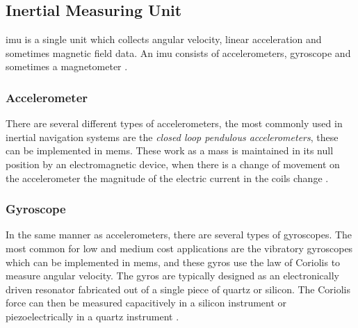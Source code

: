 \subsection{Inertial Measuring Unit}
\acrfull{imu} is a single unit which collects angular velocity, linear acceleration and sometimes magnetic field data. An \acrshort{imu} consists of accelerometers, gyroscope and sometimes a magnetometer \cite{vik}. 

\subsubsection{Accelerometer}
There are several different types of accelerometers, the most commonly used in inertial navigation systems are the \textit{closed loop pendulous accelerometers}, these can be implemented in \acrfull{mems}. These work as a mass is maintained in its null position by an electromagnetic device, when there is a change of movement on the accelerometer the magnitude of the electric current in the coils change \cite{vik}.

\subsubsection{Gyroscope}
In the same manner as accelerometers, there are several types of gyroscopes. The most common for low and medium cost applications are the vibratory gyroscopes which can be implemented in \acrshort{mems}, and these gyros use the law of Coriolis to measure angular velocity. The gyros are typically designed as an electronically driven resonator fabricated out of a single piece of quartz or silicon. The Coriolis force can then be measured capacitively in a silicon instrument or piezoelectrically in a quartz instrument \cite{vik}.